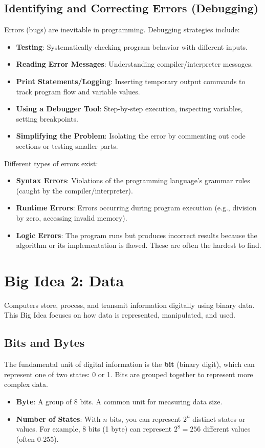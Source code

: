 \documentclass[11pt,oneside]{book}
\begin{document}
\section{Identifying and Correcting Errors (Debugging)}
\label{sec:debugging}
Errors (bugs) are inevitable in programming. Debugging strategies include:
\begin{itemize}
    \item \textbf{Testing}: Systematically checking program behavior with different inputs.
    \item \textbf{Reading Error Messages}: Understanding compiler/interpreter messages.
    \item \textbf{Print Statements/Logging}: Inserting temporary output commands to track program flow and variable values.
    \item \textbf{Using a Debugger Tool}: Step-by-step execution, inspecting variables, setting breakpoints.
    \item \textbf{Simplifying the Problem}: Isolating the error by commenting out code sections or testing smaller parts.
\end{itemize}
Different types of errors exist:
\begin{itemize}
    \item \textbf{Syntax Errors}: Violations of the programming language's grammar rules (caught by the compiler/interpreter).
    \item \textbf{Runtime Errors}: Errors occurring during program execution (e.g., division by zero, accessing invalid memory).
    \item \textbf{Logic Errors}: The program runs but produces incorrect results because the algorithm or its implementation is flawed. These are often the hardest to find.
\end{itemize}
\chapter{Big Idea 2: Data}
\label{chap:data}
Computers store, process, and transmit information digitally using binary data. This Big Idea focuses on how data is represented, manipulated, and used.

\section{Bits and Bytes}
\label{sec:bits_bytes}
The fundamental unit of digital information is the \textbf{bit} (binary digit), which can represent one of two states: 0 or 1. Bits are grouped together to represent more complex data.
\begin{itemize}
    \item \textbf{Byte}: A group of 8 bits. A common unit for measuring data size.
    \item \textbf{Number of States}: With $n$ bits, you can represent $2^n$ distinct states or values. For example, 8 bits (1 byte) can represent $2^8 = 256$ different values (often 0-255).
\end{itemize}
\end{document}
